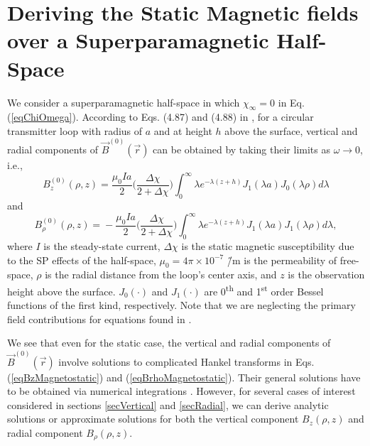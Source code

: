 \documentclass[journal]{IEEEtran}  %
\begin{document}

\section{Deriving the Static Magnetic fields over a Superparamagnetic Half-Space}
\label{secMagnetostatic}

We consider a superparamagnetic half-space in which
 $\chi_\infty = 0$ in Eq. (\ref{eqChiOmega}).
 According to Eqs. (4.87) and
(4.88) in \cite{Ward1987}, for a circular transmitter loop with
radius of $a$ and at height $h$ above the surface, vertical and
radial components of $\vec B^{(0)} (\vec r)$ can be obtained by taking
their limits as $\omega \rightarrow 0$, i.e.,
\begin{equation}
\label{eqBzMagnetostatic} B_z^{(0)}(\rho,z) \! = \! \frac{\mu_0 Ia}{2}
\Bigg ( \frac{\Delta \chi}{2+\Delta \chi} \Bigg ) \!\!
\int^{\infty}_0 \!\!\! \lambda e^{-\lambda (z+h)} J_1(\lambda a) J_0
(\lambda \rho) d \lambda
\end{equation}
and
\begin{equation}
\label{eqBrhoMagnetostatic} B^{(0)}_\rho (\rho,z) \! = \! -\frac{\mu_0
Ia}{2} \Bigg ( \frac{\Delta \chi}{2+\Delta \chi} \Bigg ) \!\!
\int^{\infty}_0 \!\!\! \lambda e^{-\lambda (z+h)} J_1(\lambda a) J_1
(\lambda \rho) d \lambda,
\end{equation}
where $I$ is the steady-state current, $\Delta \chi$
is the static magnetic susceptibility due to the SP effects of the
half-space,  $\mu_0 = 4\pi \times 10^{-7}$ \H/m
is the permeability of free-space, $\rho$ is the radial distance
from the loop's center axis, and $z$ is the observation height above
the surface. $J_0(\cdot)$ and $J_1(\cdot)$ are 0\textsuperscript{th}
and 1\textsuperscript{st} order Bessel functions of the first kind,
respectively. Note that we are neglecting the primary field contributions for equations found in \cite{Ward1987}.


We see that even for the static case, the vertical
and radial components of $\vec B^{(0)}(\vec r)$ involve solutions to
complicated Hankel transforms in Eqs. (\ref{eqBzMagnetostatic}) and
(\ref{eqBrhoMagnetostatic}). Their general solutions have to be
obtained via numerical integrations \cite{vanDam2004, vanDam2005}.
However, for several cases of interest considered in sections
\ref{secVertical} and \ref{secRadial}, we can derive analytic
solutions or approximate solutions for both the vertical component
$B_z(\rho,z)$ and radial component $B_\rho (\rho,z)$.
\end{document}
